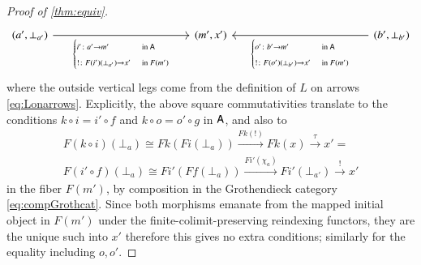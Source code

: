 \documentclass[reqno]{amsart}
\begin{document}
\begin{proof}[Proof of \cref{thm:equiv}]
\begin{equation}
\begin{tikzcd}[row sep=1in,column sep=1.7in,ampersand replacement=\&]
 (a',\bot_{a'})\ar[r,"{\begin{cases}i'\maps a'\to m' &\textrm{in }\A \\!\maps F(i')(\bot_{a'})\to x' &\textrm{in }F(m')\end{cases}}"'] \& (m',x') \& (b',\bot_{b'})\ar[l,"{\begin{cases}o'\maps b'\to m' &\textrm{in }\A \\!\maps F(o')(\bot_{b'})\to x' &\textrm{in }F(m')\end{cases}}"]
 \end{tikzcd}
\end{equation}
where the outside vertical legs come from the definition of $L$ on arrows \cref{eq:Lonarrows}. 
Explicitly, the above square commutativities translate to the conditions $k\circ i=i'\circ f$ and $k\circ o=o'\circ g$ in $\mathsf{A}$, and also to
\begin{gather}\label{eq:Grothcommutativity}
 F(k\circ i)(\bot_a)\cong Fk(Fi(\bot_a))\xrightarrow{Fk(!)}Fk(x)\xrightarrow{\tau}x'= \\
 F(i'\circ f)(\bot_a)\cong Fi'(Ff(\bot_a))\xrightarrow{Fi'(\chi_a)}Fi'(\bot_{a'})\xrightarrow{!}x'\nonumber
\end{gather}
in the fiber $F(m')$, by composition in the Grothendieck category \cref{eq:compGrothcat}. Since both morphisms emanate from the mapped initial object in $F(m')$ under the finite-colimit-preserving reindexing functors, they are the unique such into $x'$ therefore this gives no extra conditions; similarly for the equality including $o,o'$.


\end{proof}
\end{document}
